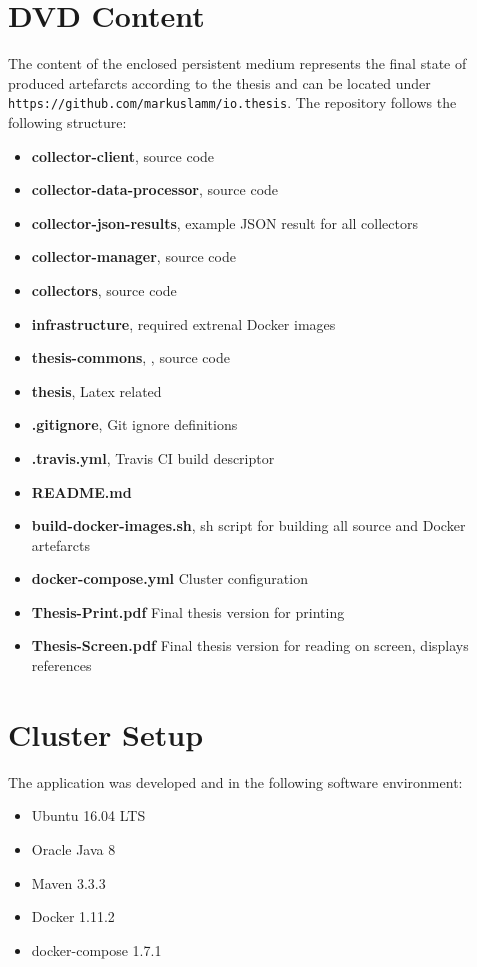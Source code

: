 \section{DVD Content}

The content of the enclosed persistent medium represents the final state of produced artefarcts according to the thesis and
can be located under \newline \verb|https://github.com/markuslamm/io.thesis|. The repository follows the following structure:

\begin{itemize}
	\item \textbf{collector-client}, source code
	\item \textbf{collector-data-processor}, source code
	\item \textbf{collector-json-results}, example JSON result for all collectors
	\item \textbf{collector-manager}, source code
	\item \textbf{collectors}, source code
	\item \textbf{infrastructure}, required extrenal Docker images
	\item \textbf{thesis-commons}, , source code
	\item \textbf{thesis}, Latex related
	\item \textbf{.gitignore}, Git ignore definitions
	\item \textbf{.travis.yml}, Travis CI build descriptor
	\item \textbf{README.md}
	\item \textbf{build-docker-images.sh}, sh script for building all source and Docker artefarcts
	\item \textbf{docker-compose.yml} Cluster configuration
	\item \textbf{Thesis-Print.pdf} Final thesis version for printing
	\item \textbf{Thesis-Screen.pdf} Final thesis version for reading on screen, displays references
\end{itemize}

\section{Cluster Setup}
The application was developed and in the following software environment:

\begin{itemize}
	\item Ubuntu 16.04 LTS
	\item Oracle Java 8
	\item Maven 3.3.3
	\item Docker 1.11.2
	\item docker-compose 1.7.1
\end{itemize}

